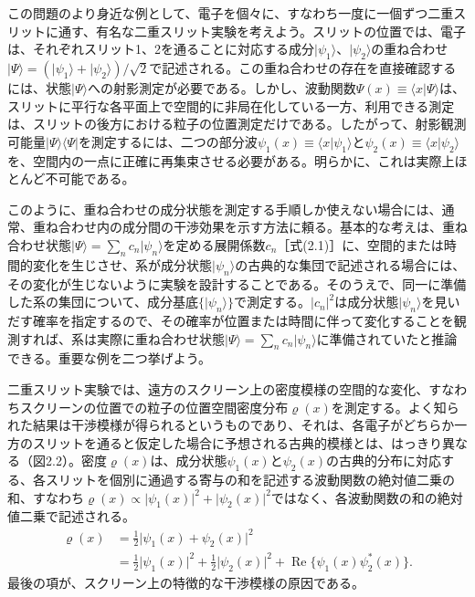 この問題のより身近な例として、電子を個々に、すなわち一度に一個ずつ二重スリットに通す、有名な二重スリット実験を考えよう。スリットの位置では、電子は、それぞれスリット1、2を通ることに対応する成分$\lvert\psi_1\rangle$、$\lvert\psi_2\rangle$の重ね合わせ$\lvert\Psi\rangle=(\lvert\psi_1\rangle+\lvert\psi_2\rangle)/\sqrt2$で記述される。この重ね合わせの存在を直接確認するには、状態$\lvert\Psi\rangle$への射影測定が必要である。しかし、波動関数$\Psi(x)\equiv\langle x\vert\Psi\rangle$は、スリットに平行な各平面上で空間的に非局在化している一方、利用できる測定は、スリットの後方における粒子の位置測定だけである。したがって、射影観測可能量$\lvert\Psi\rangle\langle\Psi\rvert$を測定するには、二つの部分波$\psi_1(x)\equiv\langle x\vert\psi_1\rangle$と$\psi_2(x)\equiv\langle x\vert\psi_2\rangle$を、空間内の一点に正確に再集束させる必要がある。明らかに、これは実際上ほとんど不可能である。

\hypertarget{srcpage:24}{}\label{srcpage:24}
このように、重ね合わせの成分状態を測定する手順しか使えない場合には、通常、重ね合わせ内の成分間の干渉効果を示す方法に頼る。基本的な考えは、重ね合わせ状態$\lvert\Psi\rangle=\sum_n c_n\lvert\psi_n\rangle$を定める展開係数$c_n$［式(2.1)］に、空間的または時間的変化を生じさせ、系が成分状態$\lvert\psi_n\rangle$の古典的な集団で記述される場合には、その変化が生じないように実験を設計することである。そのうえで、同一に準備した系の集団について、成分基底$\{\lvert\psi_n\rangle\}$で測定する。$\lvert c_n\rvert^2$は成分状態$\lvert\psi_n\rangle$を見いだす確率を指定するので、その確率が位置または時間に伴って変化することを観測すれば、系は実際に重ね合わせ状態$\lvert\Psi\rangle=\sum_n c_n\lvert\psi_n\rangle$に準備されていたと推論できる。重要な例を二つ挙げよう。

二重スリット実験では、遠方のスクリーン上の密度模様の空間的な変化、すなわちスクリーンの位置での粒子の位置空間密度分布$\varrho(x)$を測定する。よく知られた結果は干渉模様が得られるというものであり、それは、各電子がどちらか一方のスリットを通ると仮定した場合に予想される古典的模様とは、はっきり異なる（図2.2）。密度$\varrho(x)$は、成分状態$\psi_1(x)$と$\psi_2(x)$の古典的分布に対応する、各スリットを個別に通過する寄与の和を記述する波動関数の絶対値二乗の和、すなわち$\varrho(x)\propto\lvert\psi_1(x)\rvert^2+\lvert\psi_2(x)\rvert^2$ではなく、各波動関数の和の絶対値二乗で記述される。
\hypertarget{srcpage:25}{}\label{srcpage:25}
\begin{equation}\begin{split}\varrho(x)&=\frac12\lvert\psi_1(x)+\psi_2(x)\rvert^2\\&=\frac12\lvert\psi_1(x)\rvert^2+\frac12\lvert\psi_2(x)\rvert^2+\operatorname{Re}\{\psi_1(x)\psi_2^*(x)\}.\end{split}\tag{2.3}\end{equation}
最後の項が、スクリーン上の特徴的な干渉模様の原因である。

